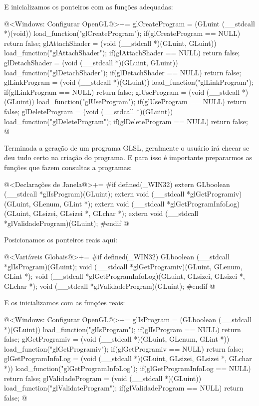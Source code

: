 E inicializamos os ponteiros com as funções adequadas:

\iniciocodigo
@<Windows: Configurar OpenGL@>+=
glCreateProgram = (GLuint (__stdcall *)(void)) load_function("glCreateProgram");
if(glCreateProgram == NULL) return false;
glAttachShader = (void (__stdcall *)(GLuint, GLuint))
                  load_function("glAttachShader");
if(glAttachShader == NULL) return false;
glDetachShader = (void (__stdcall *)(GLuint, GLuint))
                 load_function("glDetachShader");
if(glDetachShader == NULL) return false;
glLinkProgram = (void (__stdcall *)(GLuint)) load_function("glLinkProgram");
if(glLinkProgram == NULL) return false;
glUseProgram = (void (__stdcall *)(GLuint)) load_function("glUseProgram");
if(glUseProgram == NULL) return false;
glDeleteProgram = (void (__stdcall *)(GLuint)) load_function("glDeleteProgram");
if(glDeleteProgram == NULL) return false;
@
\fimcodigo

Terminada a geração de um programa GLSL, geralmente o usuário irá
checar se deu tudo certo na criação do programa. E para isso é
importante prepararmos as funções que fazem consultas a programas:

\iniciocodigo
@<Declarações de Janela@>+=
#if defined(_WIN32)
extern GLboolean (__stdcall *glIsProgram)(GLuint);
extern void (__stdcall *glGetProgramiv)(GLuint, GLenum, GLint *);
extern void (__stdcall *glGetProgramInfoLog)(GLuint, GLsizei, GLsizei *,
                                             GLchar *);
extern void (__stdcall *glValidadeProgram)(GLuint);
#endif
@
\fimcodigo

Posicionamos os ponteiros reais aqui:

\iniciocodigo
@<Variáveis Globais@>+=
#if defined(_WIN32)
GLboolean (__stdcall *glIsProgram)(GLuint);
void (__stdcall *glGetProgramiv)(GLuint, GLenum, GLint *);
void (__stdcall *glGetProgramInfoLog)(GLuint, GLsizei, GLsizei *, GLchar *);
void (__stdcall *glValidadeProgram)(GLuint);
#endif
@
\fimcodigo

E os inicializamos com as funções reais:

\iniciocodigo
@<Windows: Configurar OpenGL@>+=
glIsProgram = (GLboolean (__stdcall *)(GLuint)) load_function("glIsProgram");
if(glIsProgram == NULL) return false;
glGetProgramiv = (void (__stdcall *)(GLuint, GLenum, GLint *))
                    load_function("glGetProgramiv");
if(glGetProgramiv == NULL) return false;
glGetProgramInfoLog = (void (__stdcall *)(GLuint, GLsizei, GLsizei *, GLchar *))
                          load_function("glGetProgramInfoLog");
if(glGetProgramInfoLog == NULL) return false;
glValidadeProgram = (void (__stdcall *)(GLuint))
                     load_function("glValidateProgram");
if(glValidadeProgram == NULL) return false;
@
\fimcodigo

